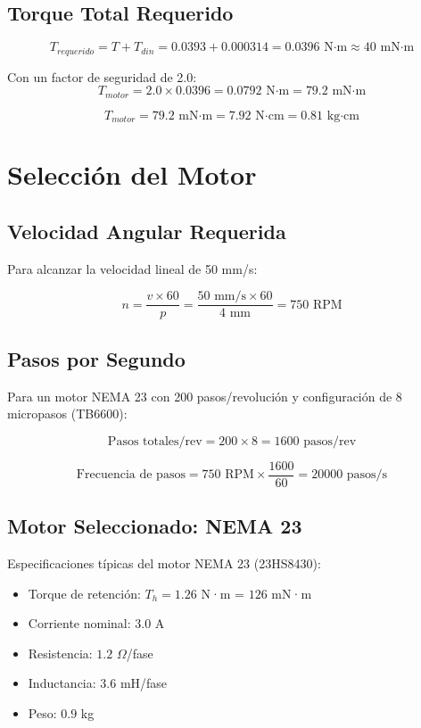 \subsection{Torque Total Requerido}
\begin{equation}
T_{requerido} = T + T_{din} = 0.0393 + 0.000314 = 0.0396 \text{ N·m} \approx 40 \text{ mN·m}
\end{equation}

Con un factor de seguridad de 2.0:
\begin{equation}
T_{motor} = 2.0 \times 0.0396 = 0.0792 \text{ N·m} = 79.2 \text{ mN·m}
\end{equation}

\begin{equation}
\boxed{T_{motor} = 79.2 \text{ mN·m} = 7.92 \text{ N·cm} = 0.81 \text{ kg·cm}}
\end{equation}

\section{Selección del Motor}

\subsection{Velocidad Angular Requerida}
Para alcanzar la velocidad lineal de 50 mm/s:

\begin{equation}
n = \frac{v \times 60}{p} = \frac{50 \text{ mm/s} \times 60}{4 \text{ mm}} = 750 \text{ RPM}
\end{equation}

\subsection{Pasos por Segundo}
Para un motor NEMA 23 con 200 pasos/revolución y configuración de 8 micropasos (TB6600):

\begin{equation}
\text{Pasos totales/rev} = 200 \times 8 = 1600 \text{ pasos/rev}
\end{equation}

\begin{equation}
\text{Frecuencia de pasos} = 750 \text{ RPM} \times \frac{1600}{60} = 20000 \text{ pasos/s}
\end{equation}

\subsection{Motor Seleccionado: NEMA 23}
Especificaciones típicas del motor NEMA 23 (23HS8430):
\begin{itemize}
    \item Torque de retención: $T_h = 1.26$ N·m = $126$ mN·m
    \item Corriente nominal: $3.0$ A
    \item Resistencia: $1.2$ $\Omega$/fase
    \item Inductancia: $3.6$ mH/fase
    \item Peso: $0.9$ kg
\end{itemize}


